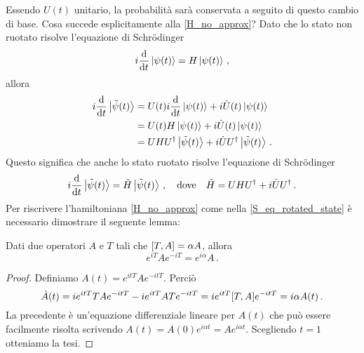 \noindent Essendo $U(t)$ unitario, la probabilità sarà conservata a seguito di questo cambio di base. Cosa succede esplicitamente alla \eqref{H_no_approx}? Dato che lo stato non ruotato risolve l'equazione di Schr\"odinger
\begin{equation*}
    i \dv{t} \ket{\psi(t)} = H \ket{\psi(t)} \, ,
\end{equation*}
allora 
\begin{align*}
    i \dv{t} \ket{\tilde{\psi}(t)} &= U(t) i \dv{t} \ket{\psi(t)} + i \dot{U}(t) \ket{\psi(t)} \\
    &= U(t) H \ket{\psi(t)} + i \dot{U}(t) \ket{\psi(t)} \\
    &= U H U^\dag \ket{\tilde{\psi}(t)} + i \dot{U} U^\dag \ket{\tilde{\psi}(t)} \, .
\end{align*}
Questo significa che anche lo stato ruotato risolve l'equazione di Schr\"odinger
\begin{equation}\label{S_eq_rotated_state}
    i \dv{t} \ket{\tilde{\psi}(t)} = \tilde{H} \ket{\tilde{\psi}(t)} \, , \quad \text{dove} \quad \tilde{H} = U H U^\dag + i \dot{U} U^\dag \, .
\end{equation}
Per riscrivere l'hamiltoniana \eqref{H_no_approx} come nella \eqref{S_eq_rotated_state} è necessario dimostrare il seguente lemma:

\begin{lemma}\label{lemma:lemma_ops}
    Dati due operatori $A$ e $T$ tali che $\comm{T}{A} = \alpha A$, allora
    \begin{equation}\label{lemma_ops}
        e^{i T} A e^{-i T} = e^{i \alpha} A \, .
    \end{equation}
\end{lemma}

\begin{proof}
    Definiamo $A(t) = e^{i t T} A e^{-i t T}$. Perciò
    \begin{equation*}
        \dot{A}(t) = i e^{i t T} T A e^{-i t T} - i e^{i t T} A T e^{-i t T} = i e^{i t T} \comm{T}{A} e^{-i t T} = i \alpha A(t) \, .
    \end{equation*}
    La precedente è un'equazione differenziale lineare per $A(t)$ che può essere facilmente risolta scrivendo
    $A(t) = A(0) e^{i \alpha t} = A e^{i \alpha t}$. Scegliendo $t = 1$ otteniamo la tesi. 
\end{proof}

